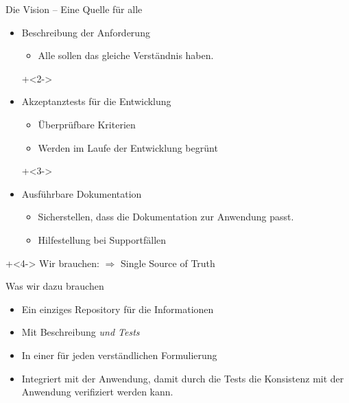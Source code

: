 \begin{frame}{Die Vision -- Eine Quelle für alle}

\begin{itemize}
	\item Beschreibung der Anforderung
	\begin{itemize}
		\item Alle sollen das gleiche Verständnis haben.
	\end{itemize}

\onslide+<2->
	
	\item Akzeptanztests für die Entwicklung
	\begin{itemize}
		\item Überprüfbare Kriterien
		\item Werden im Laufe der Entwicklung \glqq begrünt\grqq
	\end{itemize}

\onslide+<3->
	
	\item Ausführbare Dokumentation
	\begin{itemize}
		\item Sicherstellen, dass die Dokumentation zur Anwendung passt.
		\item Hilfestellung bei Supportfällen
	\end{itemize}
\end{itemize}

\onslide+<4->
Wir brauchen:	
$\Rightarrow$ Single Source of Truth

\end{frame}


\begin{frame}{Was wir dazu brauchen}

\begin{itemize}
	\item Ein einziges Repository für die Informationen
	\item Mit Beschreibung \em und \em Tests
	\item In einer für jeden verständlichen Formulierung
	\item Integriert mit der Anwendung, damit durch die Tests die Konsistenz mit der Anwendung verifiziert werden kann.
\end{itemize}

\end{frame}

